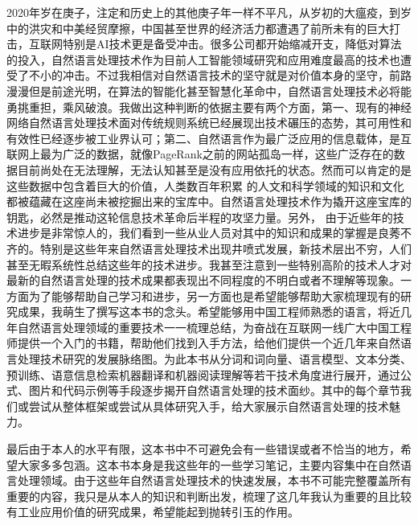 \documentclass[twoside,a4paper,12pt]{book}%
\begin{document}
2020年岁在庚子，注定和历史上的其他庚子年一样不平凡，从岁初的大瘟疫，到岁中的洪灾和中美经贸摩擦，中国甚至世界的经济活力都遭遇了前所未有的巨大打击，互联网特别是AI技术更是备受冲击。很多公司都开始缩减开支，降低对算法的投入，自然语言处理技术作为目前人工智能领域研究和应用难度最高的技术也遭受了不小的冲击。不过我相信对自然语言技术的坚守就是对价值本身的坚守，前路漫漫但是前途光明，在算法的智能化甚至智慧化革命中，自然语言处理技术必将能勇挑重担，乘风破浪。我做出这种判断的依据主要有两个方面，第一、现有的神经网络自然语言处理技术面对传统规则系统已经展现出技术碾压的态势，其可用性和有效性已经逐步被工业界认可；第二、自然语言作为最广泛应用的信息载体，是互联网上最为广泛的数据，就像PageRank之前的网站孤岛一样，这些广泛存在的数据目前尚处在无法理解，无法认知甚至是没有应用依托的状态。然而可以肯定的是这些数据中包含着巨大的价值，人类数百年积累
的人文和科学领域的知识和文化都被蕴藏在这座尚未被挖掘出来的宝库中。自然语言处理技术作为撬开这座宝库的钥匙，必然是推动这轮信息技术革命后半程的攻坚力量。另外，
由于近些年的技术进步是非常惊人的，我们看到一些从业人员对其中的知识和成果的掌握是良莠不齐的。特别是这些年来自然语言处理技术出现井喷式发展，新技术层出不穷，人们甚至无暇系统性总结这些年的技术进步。我甚至注意到一些特别高阶的技术人才对最新的自然语言处理的技术成果都表现出不同程度的不明白或者不理解等现象。一方面为了能够帮助自己学习和进步，另一方面也是希望能够帮助大家梳理现有的研究成果，我萌生了撰写这本书的念头。希望能够用中国工程师熟悉的语言，将近几年自然语言处理领域的重要技术一一梳理总结，为奋战在互联网一线广大中国工程师提供一个入门的书籍，帮助他们找到入手方法，给他们提供一个近几年来自然语言处理技术研究的发展脉络图。为此本书从分词和词向量、语言模型、文本分类、预训练、语意信息检索机器翻译和机器阅读理解等若干技术角度进行展开，通过公式、图片和代码示例等手段逐步揭开自然语言处理的技术面纱。其中的每个章节我们或尝试从整体框架或尝试从具体研究入手，给大家展示自然语言处理的技术魅力。

最后由于本人的水平有限，这本书中不可避免会有一些错误或者不恰当的地方，希望大家多多包涵。这本书本身是我这些年的一些学习笔记，主要内容集中在自然语言处理领域。由于这些年自然语言处理技术的快速发展，本书不可能完整覆盖所有重要的内容，我只是从本人的知识和判断出发，梳理了这几年我认为重要的且比较有工业应用价值的研究成果，希望能起到抛转引玉的作用。
\end{document}
